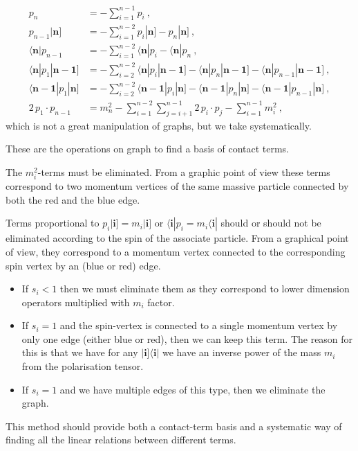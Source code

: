 \documentclass[aps,prd,nofootinbib,twocolumn,10pt]{revtex4-2}
\begin{document}
\begin{itemize}
\begin{align}
		p_n &= - \sum_{i = 1}^{n-1} p_i\ ,\\
		p_{n-1} | \mathbf{n} ] &= - \sum_{i=1}^{n-2} p_{i} | \mathbf{n} ] - p_{n} | \mathbf{n} ]\ ,\\
		\langle \mathbf{n}| p_{n-1} & = - \sum_{i=1}^{n-2} \langle \mathbf{n}| p_{i}  - \langle \mathbf{n}| p_{n}\ ,\\
		\langle \mathbf{n}| p_{1} | \mathbf{n-1} ] & = - \sum_{i=2}^{n-2} \langle \mathbf{n}| p_{i} | \mathbf{n-1} ] - \langle \mathbf{n}| p_{n} | \mathbf{n-1} ] - \langle \mathbf{n}| p_{n-1} | \mathbf{n-1} ]\ ,\\
		\langle \mathbf{n-1}| p_{1} | \mathbf{n} ] & = - \sum_{i=2}^{n-2} \langle \mathbf{n-1}| p_{i} | \mathbf{n} ] - \langle \mathbf{n-1}| p_{n} | \mathbf{n} ] - \langle \mathbf{n-1}| p_{n-1} | \mathbf{n} ]\ ,\\
		2\,  p_{1}\cdot p_{n-1} &= m_n^2 - \sum_{i=1}^{n-2} \sum_{j=i+1}^{n-1} 2\, p_{i}\cdot p_{j} - \sum_{i=1}^{n-1} m_i^2\ ,
	\end{align}
	which is not a great manipulation of graphs, but we take systematically.
\end{itemize}
These are the operations on graph to ﬁnd a basis of contact terms.

The $m_i^2$-terms must be eliminated. From a graphic point of view these terms correspond to two momentum vertices of the same massive particle connected by both the red and the blue edge.

Terms proportional to $p_i |\mathbf{i}] = m_i |\mathbf{i}]$ or $\langle \mathbf{i}| p_i = m_i \langle \mathbf{i}|$ should or should not be eliminated according to the spin of the associate particle. From a graphical point of view, they correspond to a momentum vertex connected to the corresponding spin vertex by an (blue or red) edge.
\begin{itemize}
	\item If $s_i< 1$ then we must eliminate them as they correspond to lower dimension operators multiplied with $m_i$ factor.
	\item If $s_i= 1$ and the spin-vertex is connected to a single momentum vertex by only one edge (either blue or red), then we can keep this term. The reason for this is that we have for any $|\mathbf{i}]\langle \mathbf{i}|$ we have an inverse power of the mass $m_i$ from the polarisation tensor.
	\item If $s_i= 1$ and we have multiple edges of this type, then we eliminate the graph.
\end{itemize}
This method should provide both a contact-term basis and a systematic way of finding all the linear relations between different terms.
\end{document}
